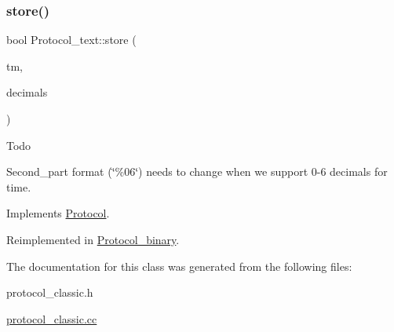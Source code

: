 \subsubsection{\texorpdfstring{store()}{store()}}
{\footnotesize\ttfamily bool Protocol\+\_\+text\+::store (\begin{DoxyParamCaption}\item[{M\+Y\+S\+Q\+L\+\_\+\+T\+I\+ME $\ast$}]{tm,  }\item[{uint}]{decimals }\end{DoxyParamCaption})\hspace{0.3cm}{\ttfamily [virtual]}}

\begin{DoxyRefDesc}{Todo}
\item[\mbox{\hyperlink{todo__todo000058}{Todo}}]Second\+\_\+part format (\char`\"{}\%06\char`\"{}) needs to change when we support 0-\/6 decimals for time. \end{DoxyRefDesc}


Implements \mbox{\hyperlink{classProtocol}{Protocol}}.



Reimplemented in \mbox{\hyperlink{classProtocol__binary_a6e11523fc3c24f22a333f39fd778f840}{Protocol\+\_\+binary}}.



The documentation for this class was generated from the following files\+:\begin{DoxyCompactItemize}
\item 
protocol\+\_\+classic.\+h\item 
\mbox{\hyperlink{protocol__classic_8cc}{protocol\+\_\+classic.\+cc}}\end{DoxyCompactItemize}
